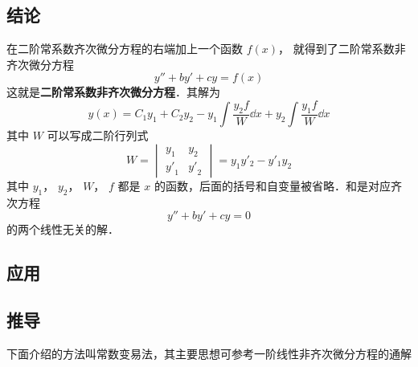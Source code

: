 

\subsection{结论}

在二阶常系数齐次微分方程的右端加上一个函数 $f(x)$， 就得到了二阶常系数非齐次微分方程
\begin{equation}\label{Ode2N_eq1}
y'' + by' + cy = f(x)
\end{equation}
这就是\textbf{二阶常系数非齐次微分方程}．其解为
\begin{equation}
y(x) = {C_1}{y_1} + {C_2}{y_2} - {y_1}\int \frac{{y_2}f}{W} \dd{x} + {y_2}\int \frac{{y_1}f}{W} \dd{x}
\end{equation}
其中 $W$ 可以写成二阶行列式
\begin{equation}
W = 
\begin{vmatrix}
{y_1}&{y_2}\\
{{y'}_1}&{{y'}_2}
\end{vmatrix} = {y_1}{y'_2} - {y'_1}{y_2}
\end{equation}
其中 $y_1$，  $y_2$，  $W$，  $f$ 都是 $x$ 的函数，后面的括号和自变量被省略．和是对应齐次方程 
\begin{equation}\label{Ode2N_eq4}
y'' + by' + cy = 0
\end{equation}
的两个线性无关的解．

\subsection{应用} %

\subsection{推导}

下面介绍的方法叫常数变易法，其主要思想可参考一阶线性非齐次微分方程的通解%

